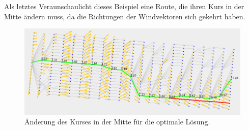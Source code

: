 Als letztes Veraunschaulicht dieses Beispiel eine Route, die ihren Kurs in der
Mitte ändern muss, da die Richtungen der Windvektoren sich gekehrt haben. 

\begin{figure}[h!]
\centering
\includegraphics[width=0.8\linewidth]{img/gridNet_20}
\caption{Änderung des Kurses in der Mitte für die optimale Lösung.}
\label{gridnet3}
\end{figure}
